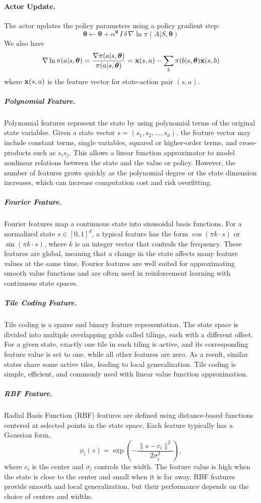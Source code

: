 \documentclass{article}
\begin{document}
\paragraph{Actor Update.}
The actor updates the policy parameters using a policy gradient step:
\[
\bm{\theta} \leftarrow \bm{\theta} + \alpha^{\bm{\theta}} \, I \, \delta \, \nabla \ln \pi(A | S, \bm{\theta})
\]
We also have
\[\nabla \ln \pi(a | s, \bm{\theta}) = \frac{\nabla \pi(a | s, \bm{\theta})}{\pi(a | s, \bm{\theta})} = \text{\textbf{x}}(s,a) - \sum_{b} \pi(b | s, \bm{\theta}) \text{\textbf{x}}(s,b)\]
where $\text{\textbf{x}}(s,a)$ is the feature vector for state-action pair $(s,a)$. 

\subparagraph{Polynomial Feature.}
Polynomial features represent the state by using polynomial terms of the original state variables. Given a state vector $s = (s_1, s_2, \dots, s_d)$, the feature vector may include constant terms, single variables, squared or higher-order terms, and cross-products such as $s_i s_j$. This allows a linear function approximator to model nonlinear relations between the state and the value or policy. However, the number of features grows quickly as the polynomial degree or the state dimension increases, which can increase computation cost and risk overfitting.

\subparagraph{Fourier Feature.}
Fourier features map a continuous state into sinusoidal basis functions. For a normalized state $s \in [0,1]^d$, a typical feature has the form $\cos(\pi k \cdot s)$ or $\sin(\pi k \cdot s)$, where $k$ is an integer vector that controls the frequency. These features are global, meaning that a change in the state affects many feature values at the same time. Fourier features are well suited for approximating smooth value functions and are often used in reinforcement learning with continuous state spaces.

\subparagraph{Tile Coding Feature.}
Tile coding is a sparse and binary feature representation. The state space is divided into multiple overlapping grids called tilings, each with a different offset. For a given state, exactly one tile in each tiling is active, and its corresponding feature value is set to one, while all other features are zero. As a result, similar states share some active tiles, leading to local generalization. Tile coding is simple, efficient, and commonly used with linear value function approximation.

\subparagraph{RBF Feature.}
Radial Basis Function (RBF) features are defined using distance-based functions centered at selected points in the state space. Each feature typically has a Gaussian form,
\[
\phi_i(s) = \exp\left(-\frac{\|s - c_i\|^2}{2\sigma_i^2}\right),
\]
where $c_i$ is the center and $\sigma_i$ controls the width. The feature value is high when the state is close to the center and small when it is far away. RBF features provide smooth and local generalization, but their performance depends on the choice of centers and widths.
\end{document}
